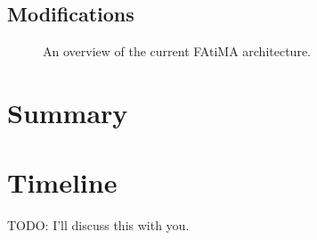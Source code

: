 \documentclass{article}
\begin{document}
\subsection{Modifications}

\begin{figure}[h]
  \caption{An overview of the current FAtiMA architecture.} \label{fatima_diagram}
\end{figure}

\section{Summary}

\section{Timeline}

TODO: I'll discuss this with you.


{}
\end{document}
